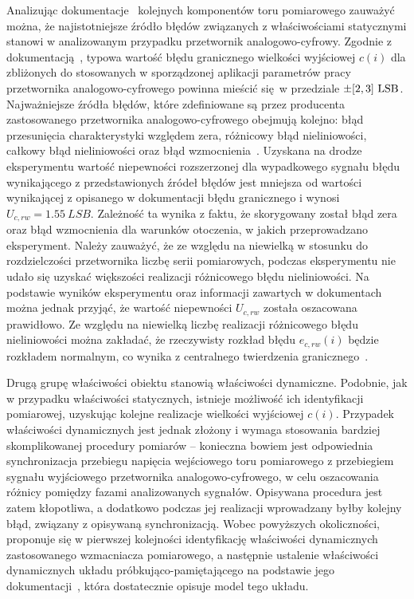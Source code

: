 Analizując dokumentacje~\cite{microchip_manual, stm_manual, diodes_manual, stm_f411} kolejnych komponentów toru pomiarowego zauważyć można, że najistotniejsze źródło błędów związanych z właściwościami statycznymi stanowi w analizowanym przypadku przetwornik analogowo-cyfrowy. Zgodnie z dokumentacją~\cite{stm_f411}, typowa wartość błędu granicznego wielkości wyjściowej $c(i)$ dla zbliżonych do stosowanych w sporządzonej aplikacji parametrów pracy przetwornika analogowo-cyfrowego powinna mieścić się w przedziale $\pm \interval{2}{3}~\unit{LSB}$. Najważniejsze źródła błędów, które zdefiniowane są przez producenta zastosowanego przetwornika analogowo-cyfrowego obejmują kolejno: błąd przesunięcia charakterystyki względem zera, różnicowy błąd nieliniowości, całkowy błąd nieliniowości oraz błąd wzmocnienia~\cite{stm_adc, stm_f411}. Uzyskana na drodze eksperymentu wartość niepewności rozszerzonej dla wypadkowego sygnału błędu wynikającego z przedstawionych źródeł błędów jest mniejsza od wartości wynikającej z opisanego w dokumentacji błędu granicznego i wynosi $U_{c,rw} = \qty{1.55}{LSB}$. Zależność ta wynika z faktu, że skorygowany został błąd zera oraz błąd wzmocnienia dla warunków otoczenia, w jakich przeprowadzano eksperyment. Należy zauważyć, że ze względu na niewielką w stosunku do rozdzielczości przetwornika liczbę serii pomiarowych, podczas eksperymentu nie udało się uzyskać większości realizacji różnicowego błędu nieliniowości. Na podstawie wyników eksperymentu oraz informacji zawartych w dokumentach~\cite{stm_f411, stm_adc} można jednak przyjąć, że wartość niepewności $U_{c,rw}$ została oszacowana prawidłowo. Ze względu na niewielką liczbę realizacji różnicowego błędu nieliniowości można zakładać, że rzeczywisty rozkład błędu $e_{c,rw}(i)$ będzie rozkładem normalnym, co wynika z centralnego twierdzenia granicznego~\cite{jcgm_guide}.

Drugą grupę właściwości obiektu stanowią właściwości dynamiczne. Podobnie, jak w przypadku właściwości statycznych, istnieje możliwość ich identyfikacji pomiarowej, uzyskując kolejne realizacje wielkości wyjściowej $c(i)$. Przypadek właściwości dynamicznych jest jednak złożony i wymaga stosowania bardziej skomplikowanej procedury pomiarów -- konieczna bowiem jest odpowiednia synchronizacja przebiegu napięcia wejściowego toru pomiarowego z przebiegiem sygnału wyjściowego przetwornika analogowo-cyfrowego, w celu oszacowania różnicy pomiędzy fazami analizowanych sygnałów. Opisywana procedura jest zatem kłopotliwa, a dodatkowo podczas jej realizacji wprowadzany byłby kolejny błąd, związany z opisywaną synchronizacją. Wobec powyższych okoliczności, proponuje się w pierwszej kolejności identyfikację właściwości dynamicznych zastosowanego wzmacniacza pomiarowego, a następnie ustalenie właściwości dynamicznych układu próbkująco-pamiętającego na podstawie jego dokumentacji~\cite{stm_f411}, która dostatecznie opisuje model tego układu.

